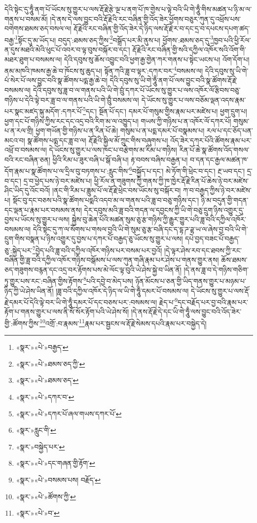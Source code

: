 དེའི་སྟེང་དུ་ཧཱུྃ་ནག་པོ་ཡོངས་སུ་གྱུར་པ་ལས་རྡོ་རྗེ་རྩེ་ལྔ་པ་ནག་པོ་ཁ་གྱེས་པ་ལྟེ་བའི་ཡི་གེ་ཧཱུྃ་གིས་མཚན་པ་ཉི་མ་ལ་གནས་པ་བསམ་མོ། །དེ་ནས་དེ་ལས་བྱུང་བའི་རྡོ་རྗེའི་རང་བཞིན་གྱི་འོད་ཟེར་ཕྱོགས་བཅུར་ཀུན་དུ་འཕྲོས་པས་བགེགས་ཐམས་ཅད་བསལ་ལ། རྡོ་རྗེའི་རང་བཞིན་གྱི་འོད་ཟེར་དེ་ཉིད་ལས་རྡོ་རྗེ་ར་བ་དང་དྲ་བ་དཔངས་དཔག་ཚད་བརྒྱ་\footnote{«སྣར་»«པེ་»བརྒྱད་}སྟོང་དུ་མ་ཡོད་པ། བདུད་:ཐམས་ཅད་ཀྱིས་\footnote{«སྣར་»«པེ་»ཐམས་ཅད་ཀྱི་}བསྒྲོད་པར་མི་ནུས་པ། ཕྱོགས་:ཐམས་ཅད་དུ་\footnote{«སྣར་»«པེ་»ཐམས་ཅད་}ཁྱབ་པའི་ཕྱི་རོལ་ན་དུས་མཐའི་མེའི་ཕུང་པོ་འབར་བ་ལྟ་བུས་བསྐོར་བ་དང་། རྡོ་རྗེའི་རང་བཞིན་གྱི་སའི་དཀྱིལ་འཁོར་སའི་འོག་གི་མཐར་ཐུག་པ་བསམས་ལ། དེའི་དབུས་སུ་ཆོས་འབྱུང་བའི་ཕྱག་རྒྱ་གྱེན་ཀར་གནས་པ་སྟེང་ཡངས་པ། འོག་དོག་པ། ནམ་མཁའི་ཁམས་རྒྱ་ཆེ་བ་ཁོངས་སུ་ཆུད་པ། སྟོན་ཀའི་ཟླ་བ་ལྟར་:དཀར་བར་\footnote{«སྣར་»«པེ་»དཀར་བ་}བསམས་ལ། དེའི་དབུས་སུ་ཡི་གེ་པཾ་སེར་པོ་ལས་བྱུང་བའི་སྣ་ཚོགས་པདྨ་རྒྱ་ཆེ་བ། དེའི་དབུས་སུ་ཡི་གེ་ཧཱུྃ་ནག་པོ་ལས་བྱུང་བའི་སྣ་ཚོགས་རྡོ་རྗེ་བསམས་ལ། དེའི་དབུས་སུ་ཟླ་བ་ལ་གནས་པའི་ཡི་གེ་བྲུཾ་དཀར་པོ་ཡོངས་སུ་གྱུར་པ་ལས་འཁོར་ལོ་རྩིབས་བཅུ་གཉིས་པ་དེའི་ལྟེ་བར་ཟླ་བ་ལ་གནས་པའི་ཡི་གེ་བྲུྃ་བསམས་ལ། དེ་ཡོངས་སུ་གྱུར་པ་ལས་བཅོམ་ལྡན་འདས་རྣམ་པར་སྣང་མཛད་སྐུ་མདོག་:དཀར་པོ་\footnote{«སྣར་»«པེ་»དཀར་པོ་ཞལ་གཡས་དཀར་པོ་}དང་། སྔོན་པོ་དང་། དམར་པོ་གསུམ་གྱིས་རྣམ་པར་མཛེས་པ། ཕྱག་དྲུག་པ། ཕྱག་དང་པོ་གཉིས་ཀྱིས་རང་དང་འདྲ་བའི་རིག་མ་ལ་འཁྱུད་པ། གཡས་ཀྱི་གཉིས་པ་ན་འཁོར་ལོ་དཀར་པོ། གསུམ་པ་ན་རལ་གྲི། ཕྱག་གཡོན་གྱི་གཉིས་པ་ན་རིན་པོ་ཆེ། གསུམ་པ་ན་པདྨ་དམར་པོ་བསྣམས་པ། རལ་པ་དང་ཅོད་པན་མངའ་བ། སྣ་ཚོགས་པདྨ་དང་ཟླ་བ་ལ། རྡོ་རྗེའི་སྐྱིལ་མོ་ཀྲུང་གིས་བཞུགས་པ། འོད་ཟེར་དཀར་པོའི་ཚོགས་རྣམ་པར་འཕྲོ་བ་བསམས་ལ། དེ་ཡོངས་སུ་གྱུར་པ་ལས་ཁང་པ་བརྩེགས་མ་རིམ་པ་གཉིས། རིན་པོ་ཆེ་སྣ་ཚོགས་འོད་གསལ་བའི་རང་བཞིན་ཅན། ཕྱིའི་རིམ་པ་ཟུར་བཞི་པ་སྒོ་བཞི་པ། རྟ་བབས་བཞིས་བརྒྱན་པ། བ་དན་དང་རྒྱལ་མཚན་ཁ་དོག་རྣམ་པ་སྣ་ཚོགས་པ་ལ་དྲིལ་བུ་བཏགས་པ་:རླུང་གིས་\footnote{«སྣར་»རླུང་གི་}བསྐྱོད་པ་དང་། མེ་ཏོག་གི་ཕྲེང་བ་དང་། རྔ་ཡབ་དང་། དྲ་བ་དང་། དྲ་བ་ཕྱེད་པས་ཉེ་བར་མཛེས་པ། ཕྱི་རོལ་ན་གཟུགས་ཀྱི་གནས་ཀྱི་ཁ་ཁྱེར་རྡོ་རྗེ་རིན་པོ་ཆེས་ཉེ་བར་མཛེས་ཤིང་ཡིད་དུ་འོང་བའོ། །ནང་གི་རིམ་པ་ཟླུམ་པོ་ལ་རྡོ་རྗེ་ཕྲེང་བས་ཡོངས་སུ་བསྐོར་བ། ཀ་བ་བརྒྱད་ཀྱིས་ཉེ་བར་མཛེས་པ། སྡོང་བུ་དང་བཅས་པའི་སྣ་ཚོགས་པདྨའི་འདབ་མ་ལ་གནས་པའི་ཟླ་བ་བཅུ་གཉིས་དང་། ཉི་མ་བདུན་གྱི་གདན་དང་ལྡན་པ་རྣམ་པར་བསམས་ནས། དེར་དབུས་མའི་ཟླ་བའི་གདན་ལ་དབྱངས་ཀྱི་ཡི་གེ་བཅུ་དྲུག་ཉིས་འགྱུར་དུ་བྱས་པ་ཡོངས་སུ་གྱུར་པ་ལས། སྐྱེས་བུ་ཆེན་པོའི་མཚན་སུམ་ཅུ་རྩ་གཉིས་ཀྱི་རྒྱུར་གྱུར་པའི་ཟླ་བའི་དཀྱིལ་འཁོར་བསམས་ལ། དེའི་སྟེང་དུ་ཀ་ལ་སོགས་པ་གསལ་བྱའི་ཡི་གེ་སུམ་ཅུ་རྩ་བཞི་དང་ད་དྷ་ཌ་ཌྷ་ཡ་ལ་ཞེས་བྱ་བའི་ཡི་གེ་དྲུག་གིས་བསྣན་པ་ཉིས་འགྱུར་དུ་བྱས་པ་དཀར་པོ་བརྒྱད་ཅུ་ཡོངས་སུ་གྱུར་པ་ལས། དཔེ་བྱད་བཟང་པོ་བརྒྱད་ཅུ་:སྐྱེད་པར་\footnote{«སྣར་»བསྐྱེད་པར་}བྱེད་པའི་ཟླ་བའི་དཀྱིལ་འཁོར་གཉིས་པར་བསམ་པར་བྱའོ། །དེ་ལྟར་ཤེས་རབ་དང་ཐབས་ཀྱི་རང་བཞིན་གྱི་ཟླ་བའི་དཀྱིལ་འཁོར་གཉིས་བསྒོམས་པ་ལས་ཀུན་གཞི་རྣམ་པར་ཤེས་པ་གནས་གྱུར་ནས། ཆོས་ཐམས་ཅད་གཟུགས་བརྙན་དང་འདྲ་བར་རྟོགས་པས་མེ་ལོང་ལྟ་བུའི་ཡེ་ཤེས་སྐྱེ་བ་ཡིན་ནོ། །དེ་ནས་ཟླ་བ་དེ་གཉིས་གཅིག་ཏུ་གྱུར་པས་རང་:བཞིན་གྱིས་རྟོགས་\footnote{«སྣར་»«པེ་»དང་གཞན་གྱི་རྟོག་}པའི་དབྱེ་བ་མེད་པས། ཉོན་མོངས་པ་ཅན་གྱི་ཡིད་གནས་གྱུར་པ་མཉམ་པ་ཉིད་ཀྱི་ཡེ་ཤེས་ཡིན་ནོ། །ཟླ་བའི་དཀྱིལ་འཁོར་དེ་ཉིད་ལ་ཡི་གེ་ཧཱུྃ་དམར་པོ་བསམས་ལ། དེ་ཡོངས་སུ་གྱུར་པ་ལས་རྡོ་རྗེ་དམར་པོ་དེའི་ལྟེ་བར་ཡི་གེ་ཧཱུྃ་དམར་པོ་དང་བཅས་པར་:བསམས་ལ། རྗེད་པ་\footnote{«སྣར་»«པེ་»བསམས་པས། བརྗོད་}དང་བརྗོད་པར་བྱ་བའི་རྣམ་པར་རྟོག་པ་གནས་གྱུར་པ་ལས་ནི་སོ་སོར་རྟོག་པའི་ཡེ་ཤེས་སོ། །དེ་ནས་རྡོ་རྗེ་དེ་དང་ཡི་གེ་ཧཱུྃ་ལས་བྱུང་བའི་འོད་ཟེར་གྱི་:ཚོགས་ཀྱིས་\footnote{«སྣར་»«པེ་»ཚོགས་ཀྱི་}འགྲོ་:བ་རྣམས་\footnote{«སྣར་»«པེ་»བ་}རྣམ་པར་སྦྱངས་ལ་རྡོ་རྗེ་སེམས་དཔའི་རྣམ་པར་བསྐྱེད་དེ། 